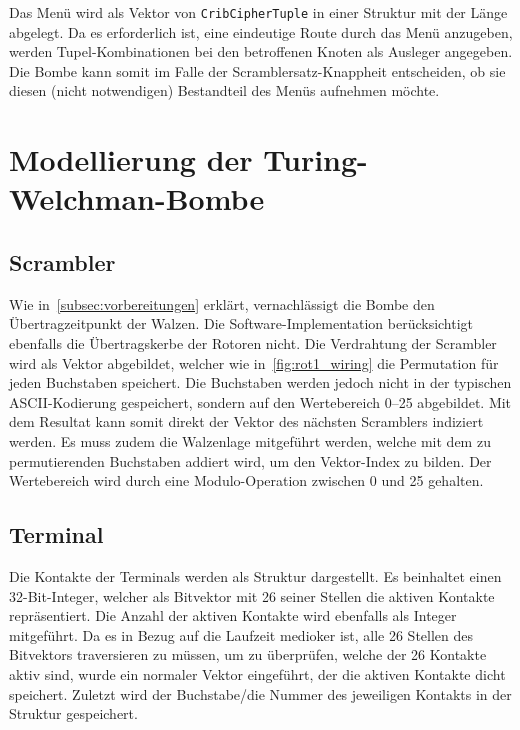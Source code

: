 Das Menü wird als Vektor von \texttt{CribCipherTuple} in einer Struktur mit der Länge abgelegt.
Da es erforderlich ist, eine eindeutige \glqq Route\grqq{} durch das Menü anzugeben, werden Tupel-Kombinationen bei den betroffenen Knoten als Ausleger angegeben. 
Die Bombe kann somit im Falle der \glqq Scramblersatz-Knappheit\grqq{} entscheiden, ob sie diesen (nicht notwendigen) Bestandteil des Menüs aufnehmen möchte.

\section{Modellierung der Turing-Welchman-Bombe}\label{sec:model}
\subsection{Scrambler}\label{subsec:impl_scrambler}
Wie in~\cref{subsec:vorbereitungen} erklärt, vernachlässigt die Bombe den Übertragzeitpunkt der Walzen.
Die Software-Implementation berücksichtigt ebenfalls die Übertragskerbe der Rotoren nicht.
Die Verdrahtung der Scrambler wird als Vektor abgebildet, welcher wie in~\cref{fig:rot1_wiring} die Permutation für jeden Buchstaben speichert.
Die Buchstaben werden jedoch nicht in der typischen ASCII-Kodierung gespeichert, sondern auf den Wertebereich 0--25 abgebildet.
Mit dem Resultat kann somit direkt der Vektor des nächsten Scramblers indiziert werden.
Es muss zudem die Walzenlage mitgeführt werden, welche mit dem zu permutierenden Buchstaben addiert wird, um den Vektor-Index zu bilden.
Der Wertebereich wird durch eine Modulo-Operation zwischen 0 und 25 gehalten.

\subsection{Terminal}\label{subsec:impl_terminal}
Die Kontakte der Terminals werden als Struktur dargestellt.
Es beinhaltet einen 32-Bit-Integer, welcher als Bitvektor mit 26 seiner Stellen die aktiven Kontakte repräsentiert.
Die Anzahl der aktiven Kontakte wird ebenfalls als Integer mitgeführt.
Da es in Bezug auf die Laufzeit medioker ist, alle 26 Stellen des Bitvektors traversieren zu müssen, um zu überprüfen, welche der 26 Kontakte aktiv sind, wurde ein normaler Vektor eingeführt, der die aktiven Kontakte \glqq dicht\grqq{} speichert.
Zuletzt wird der Buchstabe/die Nummer des jeweiligen Kontakts in der Struktur gespeichert.

